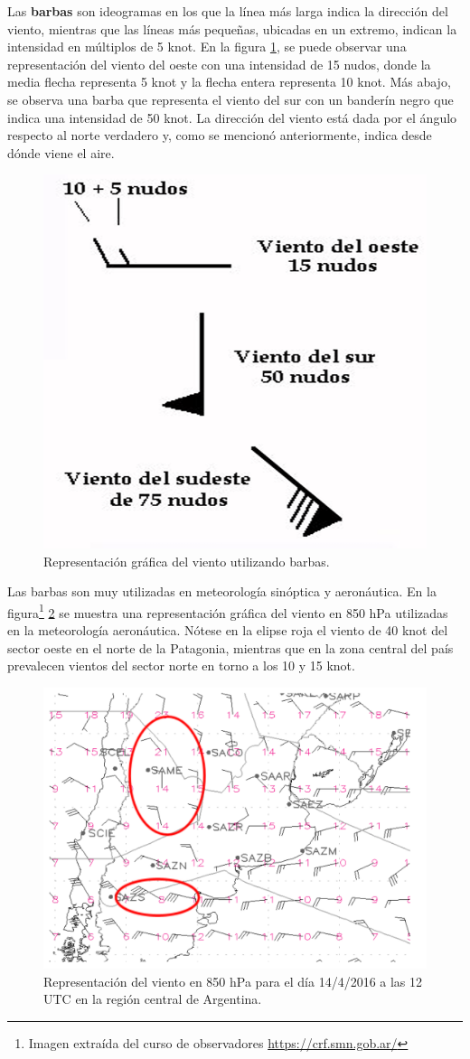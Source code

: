 Las \textbf{barbas} son ideogramas en los que la línea más larga indica la dirección del viento, mientras que las líneas más pequeñas, ubicadas en un extremo, indican la intensidad en múltiplos de 5 \unit{knot}. En la figura \ref{fig:barbas1}, se puede observar una representación del viento del oeste con una intensidad de 15 nudos, donde la media flecha representa 5 \unit{knot} y la flecha entera representa 10 \unit{knot}. Más abajo, se observa una barba que representa el viento del sur con un banderín negro que indica una intensidad de 50 \unit{knot}. La dirección del viento está dada por el ángulo respecto al norte verdadero y, como se mencionó anteriormente, indica desde dónde viene el aire.

\begin{figure}[H]
    \centering
    \includegraphics[width=0.4\linewidth]{Figuras/viento/barbas1.png}
    \caption{Representación gráfica del viento utilizando barbas.}
    \label{fig:barbas1}
\end{figure}
Las barbas son muy utilizadas en meteorología sinóptica y aeronáutica. En la figura\footnote{Imagen extraída del curso de observadores \url{https://crf.smn.gob.ar/}} \ref{fig:mapaBarbas} se muestra una representación gráfica del viento en 850 \unit{\hecto\pascal} utilizadas en la meteorología aeronáutica. Nótese en la elipse roja el viento de 40 \unit{knot} del sector oeste en el norte de la Patagonia, mientras que en la zona central del país prevalecen vientos del sector norte en torno a los 10 y 15 \unit{knot}.

\begin{figure}[H]
    \centering
    \includegraphics[width=0.85\linewidth]{Figuras/viento/mapaBarbas.png}
    \caption{Representación del viento en 850 \unit{\hecto\pascal} para el día 14/4/2016 a las 12 UTC en la región central de Argentina.}
    \label{fig:mapaBarbas}
\end{figure}


